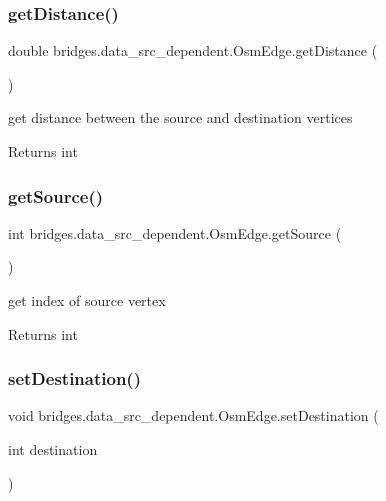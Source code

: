 \subsubsection{\texorpdfstring{getDistance()}{getDistance()}}
{\footnotesize\ttfamily double bridges.\+data\+\_\+src\+\_\+dependent.\+Osm\+Edge.\+get\+Distance (\begin{DoxyParamCaption}{ }\end{DoxyParamCaption})}

get distance between the source and destination vertices \begin{DoxyReturn}{Returns}
int 
\end{DoxyReturn}
\mbox{\label{classbridges_1_1data__src__dependent_1_1_osm_edge_a4ffc915a30144db8e3c1521772a6a26d}} 
\subsubsection{\texorpdfstring{getSource()}{getSource()}}
{\footnotesize\ttfamily int bridges.\+data\+\_\+src\+\_\+dependent.\+Osm\+Edge.\+get\+Source (\begin{DoxyParamCaption}{ }\end{DoxyParamCaption})}

get index of source vertex \begin{DoxyReturn}{Returns}
int 
\end{DoxyReturn}
\mbox{\label{classbridges_1_1data__src__dependent_1_1_osm_edge_a0bfcd0bd6dc7a4e97a078a67e41df445}} 
\subsubsection{\texorpdfstring{setDestination()}{setDestination()}}
{\footnotesize\ttfamily void bridges.\+data\+\_\+src\+\_\+dependent.\+Osm\+Edge.\+set\+Destination (\begin{DoxyParamCaption}\item[{int}]{destination }\end{DoxyParamCaption})}

